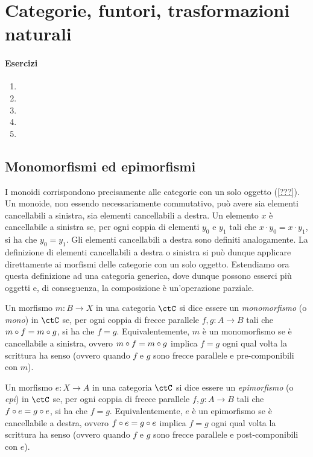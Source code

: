 \chapter{Categorie, funtori, trasformazioni naturali}
\subsubsection*{Esercizi}
\begin{enumerate}
    \item 
    \item 
    \item 
    \item 
    \item 
\end{enumerate}

\section{Monomorfismi ed epimorfismi}

I monoidi corrispondono precisamente alle categorie con un solo oggetto (\ref{???}).
Un monoide, non essendo necessariamente commutativo, può avere sia elementi cancellabili a sinistra,
sia elementi cancellabili a destra.
Un elemento \(x\) è cancellabile a sinistra se, per ogni coppia di elementi \(y_0\) e \(y_1\) tali che \(x \cdot y_0 = x \cdot y_1\),
si ha che \(y_0 = y_1\).
Gli elementi cancellabili a destra sono definiti analogamente.
La definizione di elementi cancellabili a destra o sinistra si può dunque applicare direttamente ai morfismi delle categorie con un solo oggetto.
Estendiamo ora questa definizione ad una categoria generica,
dove dunque possono esserci più oggetti e, di conseguenza, la composizione è un'operazione parziale.

\begin{definition}[Monomorfismo]
	Un morfismo \(m \colon B \to X\) in una categoria \(\ctC\) si dice essere un \emph{monomorfismo} (o \emph{mono}) in \(\ctC\) se, per ogni coppia di frecce parallele \(f, g \colon A \to B\) tali che \(m \circ f = m \circ g\), si ha che \(f = g\).
	Equivalentemente, \(m\) è un monomorfismo se è cancellabile a sinistra, ovvero \(m \circ f = m \circ g\) implica \(f = g\) ogni qual volta la scrittura ha senso (ovvero quando \(f\) e \(g\) sono frecce parallele e pre-componibili con \(m\)).
\end{definition}

\begin{definition}[Epimorfismo]
	Un morfismo \(e \colon X \to A\) in una categoria \(\ctC\) si dice essere un \emph{epimorfismo} (o \emph{epi}) in \(\ctC\) se, per ogni coppia di frecce parallele \(f, g \colon A \to B\) tali che \(f \circ e = g \circ e\), si ha che \(f = g\).
	Equivalentemente, \(e\) è un epimorfismo se è cancellabile a destra, ovvero \(f \circ e = g \circ e\) implica \(f = g\) ogni qual volta la scrittura ha senso (ovvero quando \(f\) e \(g\) sono frecce parallele e post-componibili con \(e\)).
\end{definition}



